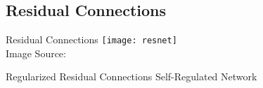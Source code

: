 \subsection{Residual Connections}
\begin{frame}[c]{Residual Connections}
    \texttt{[image: resnet]} \\
    Image Source: \cite{he_deep_2016}
\end{frame}

\begin{frame}[c]{Regularized Residual Connections}
    Self-Regulated Network \cite{xu_regnet_2021}
\end{frame}
